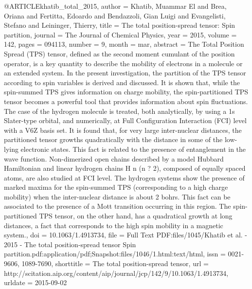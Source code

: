 @ARTICLE{khatib_total_2015,
  author = {Khatib, Muammar El and Brea, Oriana and Fertitta, Edoardo and Bendazzoli,
	Gian Luigi and Evangelisti, Stefano and Leininger, Thierry},
  title = {The total position-spread tensor: {Spin} partition},
  journal = {The Journal of Chemical Physics},
  year = {2015},
  volume = {142},
  pages = {094113},
  number = {9},
  month = mar,
  abstract = {The Total Position Spread (TPS) tensor, defined as the second moment
	cumulant of the position operator, is a key quantity to describe
	the mobility of electrons in a molecule or an extended system. In
	the present investigation, the partition of the TPS tensor according
	to spin variables is derived and discussed. It is shown that, while
	the spin-summed TPS gives information on charge mobility, the spin-partitioned
	TPS tensor becomes a powerful tool that provides information about
	spin fluctuations. The case of the hydrogen molecule is treated,
	both analytically, by using a 1s Slater-type orbital, and numerically,
	at Full Configuration Interaction (FCI) level with a V6Z basis set.
	It is found that, for very large inter-nuclear distances, the partitioned
	tensor growths quadratically with the distance in some of the low-lying
	electronic states. This fact is related to the presence of entanglement
	in the wave function. Non-dimerized open chains described by a model
	Hubbard Hamiltonian and linear hydrogen chains H n (n ? 2), composed
	of equally spaced atoms, are also studied at FCI level. The hydrogen
	systems show the presence of marked maxima for the spin-summed TPS
	(corresponding to a high charge mobility) when the inter-nuclear
	distance is about 2 bohrs. This fact can be associated to the presence
	of a Mott transition occurring in this region. The spin-partitioned
	TPS tensor, on the other hand, has a quadratical growth at long distances,
	a fact that corresponds to the high spin mobility in a magnetic system.},
  doi = {10.1063/1.4913734},
  file = {Full Text PDF:files/1045/Khatib et al. - 2015 - The total position-spread tensor Spin         partition.pdf:application/pdf;Snapshot:files/1046/1.html:text/html},
  issn = {0021-9606, 1089-7690},
  shorttitle = {The total position-spread tensor},
  url = {http://scitation.aip.org/content/aip/journal/jcp/142/9/10.1063/1.4913734},
  urldate = {2015-09-02}
}

